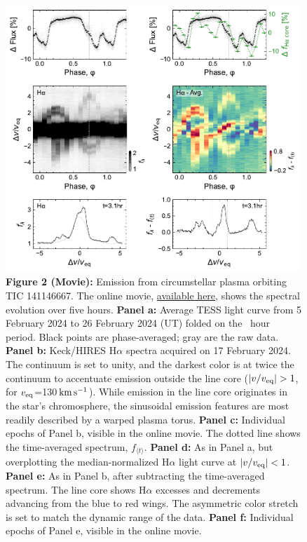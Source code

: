 \documentclass{nature3}
\newcommand{\kms}{\ensuremath{\rm km\,s^{-1}}}
\begin{document}
\begin{figure}[!tp]
  \centering
  \includegraphics[width=0.99\textwidth]{figures/f2.pdf}
  \captionsetup{labelformat=empty}
  \caption{{\bf Figure 2 (Movie):}  
  Emission from circumstellar plasma orbiting TIC 141146667.
  The online movie,
  \href{https://lgbouma.com/movies/TIC141146667_sixpanel.mp4}{available here},
  shows the spectral evolution over five hours.
  {\bf Panel a:} Average TESS light curve from 5 February 2024 to 26
  February 2024 (UT) folded on the \periodhr\ hour period.  Black
  points are phase-averaged; gray are the raw data.
  {\bf Panel b:} Keck/HIRES H$\alpha$ spectra acquired on 17
  February 2024.  The continuum is set to unity, and the darkest color
  is at twice the continuum to accentuate emission outside the line
  core ($|v/v_{\rm eq}|>1$, for $v_{\rm eq}$=130\,\kms).  While
  emission in the line core originates in the star's chromosphere,
  the sinusoidal emission features are most readily described by a
  warped plasma torus.
  {\bf Panel c:} Individual epochs of Panel b, visible in the
  online movie.  The dotted line shows the time-averaged spectrum,
  $f_{\langle t \rangle}$.
  {\bf Panel d:} As in Panel a, but overplotting the
  median-normalized H$\alpha$ light curve at $|v/v_{\rm eq}|<1$.
  {\bf Panel e:} As in Panel b, after subtracting the time-averaged
  spectrum.  The line core shows H$\alpha$ excesses and decrements
  advancing from the blue to red wings.
  The asymmetric color stretch
  is set to match the dynamic range of the data.
  {\bf Panel f:} Individual epochs of Panel e, visible in the online
  movie.}
  \label{fig:spec}
\end{figure}
\end{document}
